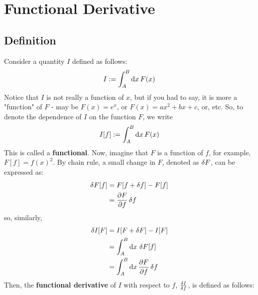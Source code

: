 \section{Functional Derivative}
\subsection{Definition}
Consider a quantity $I$ defined as follows:
\begin{align}
  I := \int_A^B \odif{x} \, F(x)
\end{align}
Notice that $I$ is not really a function of $x$, but if you had to say, it is more a "function" of $F$ - may be $F(x) = e^x$, or $F(x) = a x^2 + bx + c$, or, etc.
So, to denote the dependence of $I$ on the function $F$, we write
\begin{align}
  I[f] := \int_A^B \odif{x} \, F(x)
\end{align}
This is called a \textbf{functional}.
Now, imagine that $F$ is a function of $f$, for example, $F[f] = f(x)^2$.
By chain rule, a small change in $F$, denoted as $\fdif{F}$, can be expressed as:
\begin{align}
  \fdif{F}[f] & = F[f + \fdif{f}] - F[f] \\
              & = \pdv{F}{f} \fdif{f}
\end{align}
so, similarly,
\begin{align}
  \fdif{I}[F] & = I[F + \fdif{F}] - I[F]                   \\
              & = \int_A^B \odif{x} \, \fdif{F}[f]         \\
              & = \int_A^B \odif{x} \, \pdv{F}{f} \fdif{f}
\end{align}
Then, the \textbf{functional derivative} of $I$ with respect to $f$, $\fdv{I}{f}$, is defined as follows:


